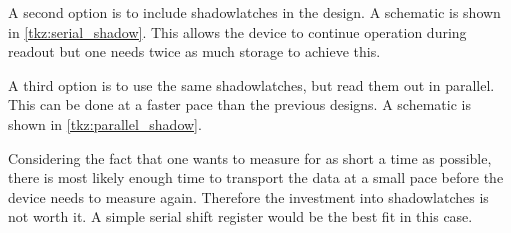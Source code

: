 A second option is to include shadowlatches in the design. A schematic is shown in \cref{tkz:serial_shadow}. This allows the device to continue operation during readout but one needs twice as much storage to achieve this.



A third option is to use the same shadowlatches, but read them out in parallel. This can be done at a faster pace than the previous designs. A schematic is shown in \cref{tkz:parallel_shadow}. 



Considering the fact that one wants to measure for as short a time as possible, there is most likely enough time to transport the data at a small pace before the device needs to measure again. Therefore the investment into shadowlatches is not worth it. A simple serial shift register would be the best fit in this case.



